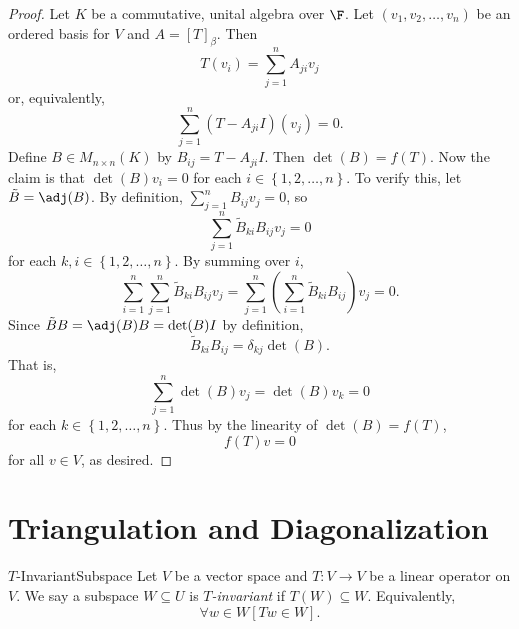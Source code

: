 \documentclass[linearalgebraII]{subfiles}
\begin{document}
    \begin{proof}
        Let $K$ be a commutative, unital algebra over $\F$. Let $\left( v_1, v_2, \ldots, v_n \right)$ be an ordered basis for $V$ and $A = \left[ T \right]_\beta$. Then
        \begin{equation*}
            T(v_i) = \sum^{n}_{j=1} A_{ji}v_j
        \end{equation*} 
        or, equivalently,
        \begin{equation*}
            \sum^{n}_{j=1} \left( T - A_{ji}I \right) (v_j) = 0.
        \end{equation*}
        Define $B\in M_{n\times n}(K)$ by $B_{ij} = T - A_{ji}I$. Then $\det(B) = f(T)$. Now the claim is that $\det(B)v_i = 0$ for each $i\in \left\lbrace 1, 2, \ldots, n \right\rbrace$. To verify this, let $\tilde{B} = \adj(B)$. By definition, $\sum^{n}_{j=1} B_{ij}v_j = 0$, so
        \begin{equation*}
            \sum^{n}_{j=1} \tilde{B}_{ki} B_{ij} v_j = 0
        \end{equation*}
        for each $k, i\in \left\lbrace 1, 2, \ldots, n \right\rbrace$. By summing over $i$,
        \begin{equation*}
            \sum^{n}_{i=1} \sum^{n}_{j=1} \tilde{B}_{ki}B_{ij}v_j = \sum^{n}_{j=1} \left( \sum^{n}_{i=1} \tilde{B}_{ki} B_{ij} \right) v_j = 0. 
        \end{equation*}
        Since $\tilde{B}B = \adj(B)B = \det(B)I$ by definition,
        \begin{equation*}
            \tilde{B}_{ki}B_{ij} = \delta_{kj}\det(B).
        \end{equation*}
        That is,
        \begin{equation*}
            \sum^{n}_{j=1} \det(B)v_j = \det(B)v_k = 0
        \end{equation*}
        for each $k\in \left\lbrace 1, 2, \ldots, n \right\rbrace$. Thus by the linearity of $\det(B) = f(T)$,
        \begin{equation*}
            f(T)v = 0
        \end{equation*}
        for all $v\in V$, as desired.
    \end{proof}
    
    \section{Triangulation and Diagonalization}

    \begin{definition}{$T$-Invariant}{Subspace}
        Let $V$ be a vector space and $T:V\to V$ be a linear operator on $V$. We say a subspace $W\subseteq U$ is \emph{$T$-invariant} if $T(W)\subseteq W$. Equivalently,
        \begin{equation*}
            \forall w\in W \left[ Tw\in W \right].
        \end{equation*}
    \end{definition}
\end{document}
